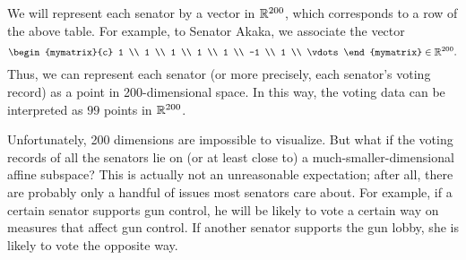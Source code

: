 We will represent each senator by a vector in $\mathbb{R}^{200}$, which
corresponds to a row of the above table. For example, to Senator
Akaka, we associate the vector
\begin{equation*}
  \begin{mymatrix}{c} 1 \\ 1 \\ 1 \\ 1 \\ 1 \\ -1 \\ 1 \\ \vdots \end{mymatrix}
  \in\R^{200}.
\end{equation*}
Thus, we can represent each senator (or more precisely, each senator's
voting record) as a point in 200-dimensional space. In this way, the
voting data can be interpreted as $99$ points in $\mathbb{R}^{200}$.

Unfortunately, 200 dimensions are impossible to visualize. But what if
the voting records of all the senators lie on (or at least close to) a
much-smaller-dimensional affine subspace? This is actually not an
unreasonable expectation; after all, there are probably only a handful
of issues most senators care about. For example, if a certain senator
supports gun control, he will be likely to vote a certain way on
measures that affect gun control. If another senator supports the gun
lobby, she is likely to vote the opposite way.


